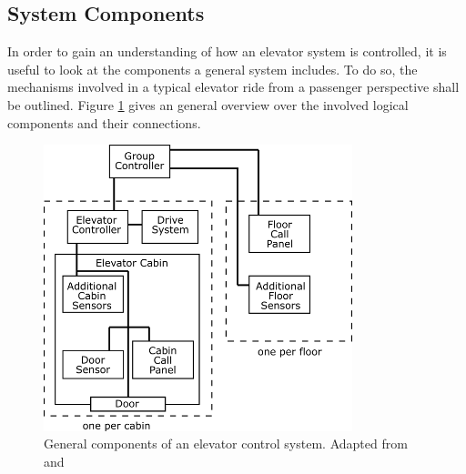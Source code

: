 \subsection{System Components}

In order to gain an understanding of how an elevator system is controlled,
it is useful to look at the components a general system includes.
To do so, the mechanisms involved in a typical elevator ride 
from a passenger perspective shall be outlined.
Figure \ref{fig:sota:systemcomponents} gives an general overview over the involved logical components and their connections.

\begin{figure}[hbt]
	\centering
	\includegraphics[width=0.8\textwidth, keepaspectratio]{resources/systemcomponets}
	\caption{\label{fig:sota:systemcomponents} General components of an elevator control system. Adapted from \textcite[][pp.~4,16]{xang2016trafficlist} and  \textcite[][p.~10]{siikonen1997models}}
\end{figure}

